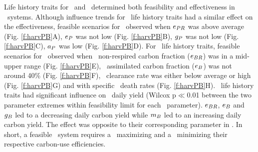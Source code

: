 \documentclass[../thesis.tex]{subfiles} %
\begin{document}
Life history traits for \phy\ and \bac\ determined both feasibility and effectiveness in \PBH\ systems.  Although influence trends for \phy\ life history traits had a similar effect on the effectiveness, feasible scenarios for \PBH\ observed when $e_{PR}$ was above average (Fig. \ref{f:harvPB}A), $e_P$ was not low (Fig. \ref{f:harvPB}B), $g_P$ was not low (Fig. \ref{f:harvPB}C), $a_P$ was low (Fig. \ref{f:harvPB}D).  For \bac\ life history traits, feasible scenarios for \PBH\ observed when \bac\ non-respired carbon fraction ($e_{BR}$) was in a mid-upper range (Fig. \ref{f:harvPB}E), \bac\ assimilated carbon fraction ($e_B$) was not around 40\% (Fig. \ref{f:harvPB}F), \bac\ clearance rate was either below average or high (Fig. \ref{f:harvPB}G) and with specific \bac\ death rates (Fig. \ref{f:harvPB}H).  \Bac\ life history traits had significant influence on \PBH\ daily yield (Wilcox p$\ll$0.01 between the two parameter extremes within feasibility limit for each \bac\ parameter).  $e_{BR}$, $e_B$ and $g_B$ led to a decreasing daily carbon yield while $m_B$ led to an increasing daily carbon yield.  The effect was opposite to their corresponding parameter in \phy.  In short, a feasible \PBH\ system requires a \phy\ maximizing and a \bac\ minimizing their respective carbon-use efficiencies.
\end{document}
